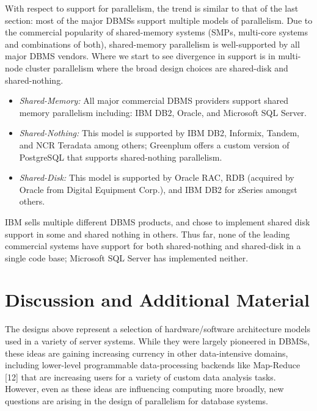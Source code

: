 \documentclass[b5paper,11pt,twoside,openright]{book}
\begin{document}
With respect to support for parallelism, the trend is similar to that of
the last section: most of the major DBMSs support multiple models of
parallelism. Due to the commercial popularity of shared-memory systems
(SMPs, multi-core systems and combinations of both), shared-memory
parallelism is well-supported by all major DBMS vendors. Where we start
to see divergence in support is in multi-node cluster parallelism where
the broad design choices are shared-disk and shared-nothing.

\begin{itemize}

\item
  \emph{Shared-Memory:} All major commercial DBMS providers
support shared memory parallelism including: IBM DB2, Oracle, and
Microsoft SQL Server.
\item
  \emph{Shared-Nothing:} This model is supported by IBM DB2, Informix,
  Tandem, and NCR Teradata among others; Greenplum offers a custom
  version of PostgreSQL that supports shared-nothing parallelism.
\item
  \emph{Shared-Disk:} This model is supported by Oracle RAC, RDB
  (acquired by Oracle from Digital Equipment Corp.), and IBM DB2 for
  zSeries amongst others.
\end{itemize}

IBM sells multiple different DBMS products, and chose to implement
shared disk support in some and shared nothing in others. Thus far, none
of the leading commercial systems have support for both shared-nothing
and shared-disk in a single code base; Microsoft SQL Server has
implemented neither.

\hypertarget{discussion-and-additional-material-1}{%
\section{Discussion and Additional
Material}\label{discussion-and-additional-material-1}}

The designs above represent a selection of hardware/software
architecture models used in a variety of server systems. While they were
largely pioneered in DBMSs, these ideas are gaining increasing currency
in other data-intensive domains, including lower-level programmable
data-processing backends like Map-Reduce {[}12{]} that are increasing
users for a variety of custom data analysis tasks. However, even as
these ideas are influencing computing more broadly, new questions are
arising in the design of parallelism for database systems.
\end{document}
